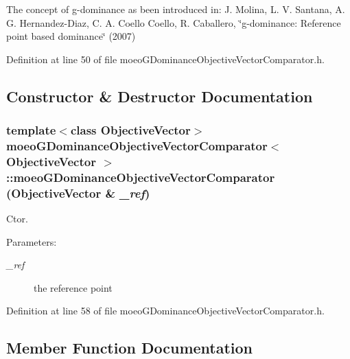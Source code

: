 The concept of g-dominance as been introduced in: J. Molina, L. V. Santana, A. G. Hernandez-Diaz, C. A. Coello Coello, R. Caballero, \char`\"{}g-dominance: Reference point based dominance\char`\"{} (2007) 



Definition at line 50 of file moeo\-GDominance\-Objective\-Vector\-Comparator.h.

\subsection{Constructor \& Destructor Documentation}
\subsubsection{\setlength{\rightskip}{0pt plus 5cm}template$<$class Objective\-Vector$>$ \bf{moeo\-GDominance\-Objective\-Vector\-Comparator}$<$ \bf{Objective\-Vector} $>$::\bf{moeo\-GDominance\-Objective\-Vector\-Comparator} (\bf{Objective\-Vector} \& {\em \_\-ref})\hspace{0.3cm}{\tt  [inline]}}\label{classmoeoGDominanceObjectiveVectorComparator_fc4e1f1201b6420d206b28ab98e9ea0d}


Ctor. 

\begin{Desc}
\item[Parameters:]
\begin{description}
\item[{\em \_\-ref}]the reference point \end{description}
\end{Desc}


Definition at line 58 of file moeo\-GDominance\-Objective\-Vector\-Comparator.h.

\subsection{Member Function Documentation}
